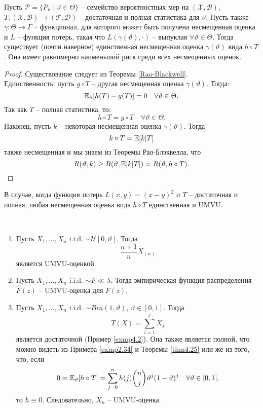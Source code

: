 \begin{thm} \label{Lehmann-Scheffe}
	Пусть $\mathcal{P}=\{ P_\vartheta \mid \vartheta \in \Theta \}$ -- семейство вероятностных мер на $(\mathcal{X},\mathcal{B})$, $T:(\mathcal{X},\mathcal{B}) \rightarrow (\mathcal{T},\mathcal{D})$ -- достаточная и полная статистика для $\vartheta$. Пусть также $\gamma:\Theta \rightarrow \Gamma$ -- функционал, для которого может быть получена несмещенная оценка и $L$ -- функция потерь, такая что $L(\gamma(\vartheta), \cdot)$ -- выпуклая $\forall \vartheta \in \Theta$. Тогда существует (почти наверное) единственная несмещенная оценка $\gamma(\vartheta)$ вида $h \circ T$. Она имеет равномерно наименьший риск среди всех несмещенных оценок.
\end{thm}
\begin{proof}
	Существование следует из Теоремы \ref{Rao-Blackwell}. \\
	Единственность: пусть $g \circ T$ -- другая несмещенная оценка $\gamma(\vartheta)$. Тогда:
	\[ \mathbb{E}_\vartheta[h(T)-g(T)]=0 \quad \forall \vartheta \in \Theta. \]
	Так как $T$ -- полная статистика, то:
	\[ h \circ T = g \circ T \quad \forall \vartheta \in \Theta. \]
	Наконец, пусть $k$ -- некоторая несмещенная оценка $\gamma(\vartheta)$. Тогда
	\[k \circ T = \mathbb{E}[k|T]\]
	также несмещенная и мы знаем из Теоремы Рао-Блэквелла, что
	\[ R(\vartheta, k) \geq R(\vartheta, \mathbb{E}[k|T])=R(\vartheta, h \circ T). \]
\end{proof}

\begin{crlr}
	В случае, когда функция потерь $L(x,y)=(x-y)^2$ и $T$ -- достаточная и полная, любая несмещенная оценка вида $h \circ T$ единственная и UMVU.
\end{crlr}

\begin{exmp} \label{exmp4.30} \
	\begin{enumerate}
		\item Пусть $X_1, \dots, X_n$ i.i.d. $\sim \mathcal{U}[0,\vartheta]$. Тогда
		\[ \frac{n+1}{n}X_{(n)} \]
		является UMVU-оценкой.
		\item Пусть $X_1, \dots, X_n$ i.i.d. $\sim F \ll \lambda$. Тогда эмпирическая функция распределения $\hat{F}(z)$ -- UMVU-оценка для $F(z)$.
		\item Пусть $X_1, \dots, X_n$ i.i.d. $\sim Bin(1,\vartheta)$, $\vartheta \in [0, 1]$. Тогда
		\[ T(X)=\sum_{i=1}^{j}X_j \]
		является достаточной (Пример \ref{exmp4.2}). Она также является полной, что можно видеть из Примера \ref{exmp2.34} и Теоремы \ref{thm4.25} или же из того, что, если
		\[ 0 = \mathbb{E}_\vartheta[h \circ T]=\sum_{j=0}^{n}h(j)\binom{n}{j}\vartheta^j(1-\vartheta)^j \quad \forall \vartheta \in [0, 1], \]
		то $h \equiv 0$. Следовательно, $\overline{X}_n$ -- UMVU-оценка.
	\end{enumerate}
\end{exmp}

